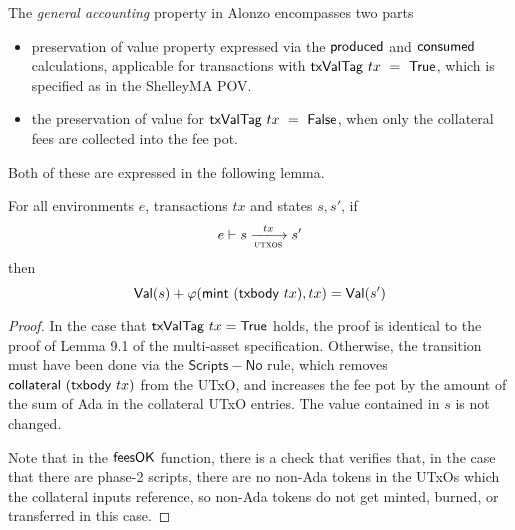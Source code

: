 \begin{property}
  \label{prop:pov}
  The \emph{general accounting} property in Alonzo encompasses two parts
  \begin{itemize}
    \item preservation of value property expressed via the $\mathsf{produced}$ and $\mathsf{consumed}$
    calculations, applicable for transactions with $\mathsf{txValTag}~tx~=~\mathsf{True}$, which
    is specified as in the ShelleyMA POV.
    \item the preservation of value for $\mathsf{txValTag}~tx~=~\mathsf{False}$, when
    only the collateral fees are collected into the fee pot.
  \end{itemize}

Both of these are expressed in the following lemma.

\begin{lemma}
  For all environments $e$, transactions $tx$ and states $s, s'$, if
  \begin{equation*}
    e\vdash s\trans{utxos}{tx}s'
  \end{equation*}
  then
  \begin{equation*}
    \mathsf{Val}(s) + \varphi(\mathsf{mint}~(\mathsf{txbody}~tx), tx) = \mathsf{Val}(s')
  \end{equation*}
\end{lemma}

\begin{proof}
  In the case that $\mathsf{txValTag}~tx = \mathsf{True}$ holds, the proof is
  identical to the proof of Lemma 9.1 of the multi-asset
  specification. Otherwise, the transition must have been done via the
  $\mathsf{Scripts-No}$ rule, which removes
  $\mathsf{collateral}~(\mathsf{txbody}~tx)$ from the UTxO, and increases the fee pot by the amount of the sum of Ada in the
  collateral UTxO entries. The value contained in $s$ is not changed.

  Note that in the $\mathsf{feesOK}$ function, there is a check that verifies
  that, in the case that there are phase-2 scripts, there are no non-Ada tokens in the UTxOs
  which the collateral inputs reference, so non-Ada tokens do not get minted, burned, or transferred
  in this case.
\end{proof}
\end{property}

